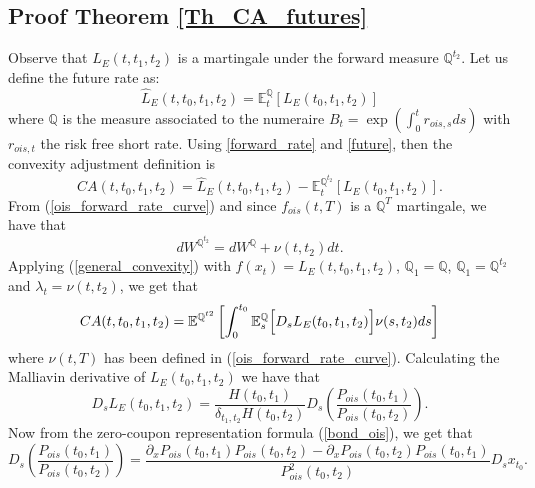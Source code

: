 \documentclass[a4paper,10pt]{article}
\newcommand{\1}{\mathbf{1}}
\begin{document}
\subsection{Proof Theorem \ref{Th_CA_futures}}\label{Proof_CA_futures}
Observe that $L_{E}(t, t_1, t_2)$ is a martingale under the forward measure $\mathbb{Q}^{t_2}$. Let us define the future rate as:    
\begin{equation}\label{future}
\hat{L}_{E}(t,t_0, t_1, t_2) = \mathbb{E}_t^{\mathbb{Q}}\left[L_{E}(t_0, t_1, t_2) \right]
\end{equation}
where $\mathbb{Q}$ is the measure associated to the numeraire $B_t=\exp\left(\int_{0}^{t} r_{ois, s} ds \right)$ with $ r_{ois, t}$ the risk free short rate. Using
\eqref{forward_rate} and \eqref{future}, then the convexity adjustment definition is
\begin{equation*}
CA(t, t_0, t_1, t_2) = \hat{L}_{E}(t,t_0, t_1, t_2) - \mathbb{E}_t^{\mathbb{Q}^{t_2}}\left[L_{E}(t_0, t_1, t_2) \right].
\end{equation*}
From (\ref{ois_forward_rate_curve}) and since $f_{ois}(t,T)$ is a $\mathbb{Q}^{T}$ martingale, we have that
\begin{equation}\label{girsanov_spot_forward}
dW^{\mathbb{Q}^{t_2}} = dW^{\mathbb{Q}} + \nu(t,t_2) dt. 
\end{equation}
Applying (\ref{general_convexity}) with $f(x_t)=L_{E}(t,t_0, t_1, t_2)$, $\mathbb{Q}_1=\mathbb{Q}$, $\mathbb{Q}_1=\mathbb{Q}^{t_2}$ and $\lambda_t = \nu(t,t_2)$,  we get that
\begin{equation}\label{ca_general_future}
CA(t, t_0, t_1, t_2) = \mathbb{E}^{\mathbb{Q}^{t2}}\left[\int_{0}^{t_0} \mathbb{E}^{\mathbb{Q}}_{s}\Bigl[D_s L_{E}(t_0,t_1,t_2) \Bigr] \nu(s,t_2) ds \right]
\end{equation}
where $\nu(t,T)$ has been defined in (\ref{ois_forward_rate_curve}). Calculating the Malliavin derivative of $L_{E}(t_0,t_1,t_2)$ we have that
\begin{equation*}
D_s L_{E}(t_0,t_1,t_2) = \frac{H(t_0,t_1)}{\delta_{t_1,t_2}H(t_0,t_2)} D_s \left(\frac{P_{ois}(t_0,t_1)}{P_{ois}(t_0,t_2)}\right).
\end{equation*}
Now from the zero-coupon representation formula (\ref{bond_ois}), we get that
\begin{equation*}
D_s \left(\frac{P_{ois}(t_0,t_1)}{P_{ois}(t_0,t_2)}\right) = \frac{\partial_{x}P_{ois}(t_0,t_1)P_{ois}(t_0,t_2) - \partial_{x}P_{ois}(t_0,t_2) P_{ois}(t_0,t_1)}{P^{2}_{ois}(t_0,t_2)} D_s x_{t_0}.
\end{equation*}
\end{document}
